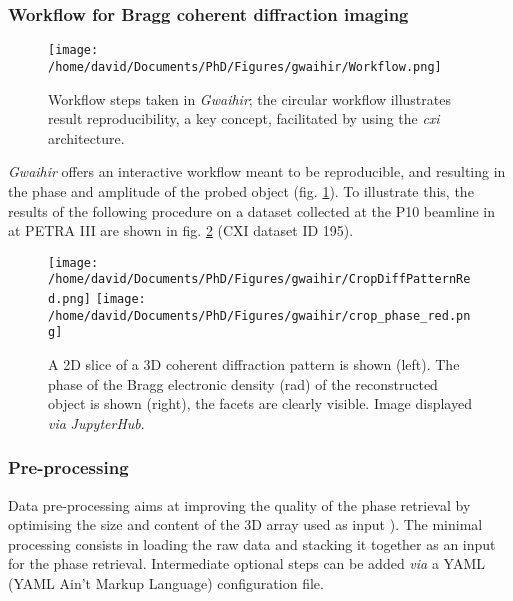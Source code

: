 \subsubsection{Workflow for Bragg coherent diffraction imaging} \label{sec:Workflow}

\begin{figure}[!htb]
    \centering
    \texttt{[image: /home/david/Documents/PhD/Figures/gwaihir/Workflow.png]}
    \caption{Workflow steps taken in \textit{Gwaihir}; the circular workflow illustrates result reproducibility, a key concept, facilitated by using the \textit{cxi} architecture.}
    \label{fig:Workflow}
\end{figure}

\textit{Gwaihir} offers an interactive workflow meant to be reproducible, and resulting in the phase and amplitude of the probed object (fig. \ref{fig:Workflow}).
To illustrate this, the results of the following procedure on a dataset collected at the P10 beamline in at PETRA III are shown in fig. \ref{fig:GUI_file} (CXI dataset ID 195).

\begin{figure}[!htb]
    \centering
    \texttt{[image: /home/david/Documents/PhD/Figures/gwaihir/CropDiffPatternRed.png]}
    \texttt{[image: /home/david/Documents/PhD/Figures/gwaihir/crop\_phase\_red.png]}
    \caption{
    A 2D slice of a 3D coherent diffraction pattern is shown (left).
    The phase of the Bragg electronic density (\unit{\radian}) of the reconstructed object is shown (right), the facets are clearly visible.
    Image displayed \textit{via} \textit{JupyterHub}.
    }
    \label{fig:GUI_file}
\end{figure}

\subsubsection{Pre-processing} \label{sec:preprocess}

Data pre-processing aims at improving the quality of the phase retrieval by optimising the size and content of the 3D array used as input \parencite{Ozturk2017}).
The minimal processing consists in loading the raw data and stacking it together as an input for the phase retrieval.
Intermediate optional steps can be added \textit{via} a YAML (YAML Ain't Markup Language) configuration file.

